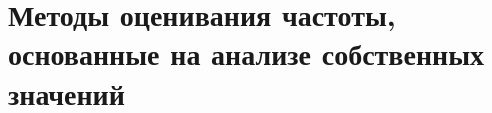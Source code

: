 \documentclass[a4paper,14pt]{extarticle}
\begin{document}
\section{Методы оценивания частоты, основанные на анализе собственных значений}%
\label{sec:metody_otsenivaniia_chastoty_osnovannye_na_analize_sobstvennykh_znachenii}
\end{document}
